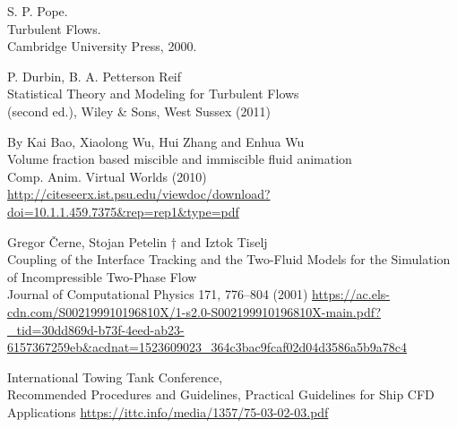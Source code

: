 \documentclass[a4paper, 12pt]{report}
\begin{document}
\begin{thebibliography}{9}
	S. P. Pope.\\
	Turbulent Flows.\\
	Cambridge University Press, 2000.

	 P. Durbin, B. A. Petterson Reif\\
	 Statistical Theory and Modeling for Turbulent Flows\\
	(second ed.), Wiley \& Sons, West Sussex (2011)
	
	By Kai Bao, Xiaolong Wu, Hui Zhang and Enhua Wu\\
	Volume fraction based miscible and immiscible fluid animation\\
	Comp. Anim. Virtual Worlds (2010)
	\url{http://citeseerx.ist.psu.edu/viewdoc/download?doi=10.1.1.459.7375&rep=rep1&type=pdf}
	
	Gregor Černe, Stojan Petelin † and Iztok Tiselj\\
	Coupling of the Interface Tracking and the Two-Fluid Models 		for the Simulation of Incompressible Two-Phase Flow\\
	Journal of Computational Physics 171, 776–804 (2001)
	\url{https://ac.els-cdn.com/S002199910196810X/1-s2.0-S002199910196810X-main.pdf?_tid=30dd869d-b73f-4eed-ab23-6157367259eb&acdnat=1523609023_364c3bac9fcaf02d04d3586a5b9a78c4}
	
	International Towing Tank Conference,\\
	Recommended Procedures and Guidelines, Practical Guidelines for Ship CFD Applications
	\url{https://ittc.info/media/1357/75-03-02-03.pdf}
	
\end{thebibliography}
\end{document}
